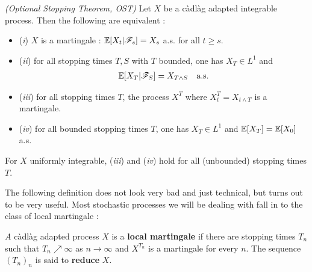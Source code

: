 \documentclass[12pt,a4paper]{article}
\renewenvironment{i}
{\begin{itemize} 
	}%
	{\end{itemize}
}
\begin{document}
\thm \emph{(Optional Stopping Theorem, OST)} Let $X$ be a c\`adl\`ag adapted integrable process. Then the following are equivalent :
\begin{i}
\item[(\textit{i})] $X$ is a martingale : $\mathbb{E}[X_t | \mathscr{F}_s]  = X_s$ a.s. for all $t\geq s$.
\item[(\textit{ii})] for all stopping times $T,S$ with $T$ bounded, one has $X_T \in L^1$ and
\begin{align*}
\mathbb{E}[X_T | \mathscr{F}_S] = X_{T\wedge S} \quad \text{a.s.}
\end{align*}
\item[(\textit{iii})] for all stopping times $T$, the process $X^T$ where $X_t^T = X_{t\wedge T}$ is a martingale.
\item[(\textit{iv})] for all bounded stopping times $T$, one has $X_T \in L^1$ and $\mathbb{E}[X_T]= \mathbb{E}[X_0]$ a.s.
\end{i}
For $X$ uniformly integrable, (\textit{iii}) and (\textit{iv}) hold for all (unbounded) stopping times $T$.
\s

The following definition does not look very bad and just technical, but turns out to be very useful. Most stochastic processes we will be dealing with fall in to the class of local martingale :
\s

 $A$ c\`adl\`ag adapted process $X$ is a \textbf{local martingale} if there are stopping times $T_n$ such that $T_n \nearrow \infty$ as $n\rightarrow \infty$ and $X^{T_n}$ is a martingale for every $n$. The sequence $(T_n)_n$ is said to \textbf{reduce} $X$.
\s
\end{document}
